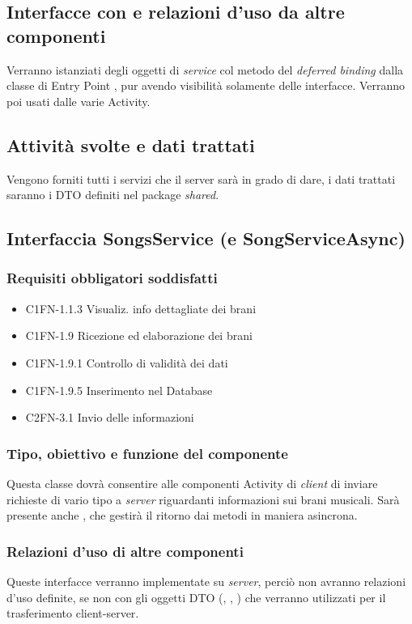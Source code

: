 \subsection*{Interfacce con e relazioni d'uso da altre componenti}
Verranno istanziati degli oggetti di \emph{service} col metodo del
\emph{deferred binding} dalla classe di Entry Point , pur avendo
visibilit\`a solamente delle interfacce. Verranno poi usati dalle varie Activity.

\subsection*{Attivit\`a svolte e dati trattati}
Vengono forniti tutti i servizi che il server sar\`a in grado di dare, i dati
trattati saranno i DTO definiti nel package \emph{shared}.

\subsection{Interfaccia SongsService (e SongServiceAsync)}
\subsubsection*{Requisiti obbligatori soddisfatti}
\begin{itemize}
	\item C1FN-1.1.3 Visualiz. info dettagliate dei brani
	\item C1FN-1.9 Ricezione ed elaborazione dei brani
	\item C1FN-1.9.1 Controllo di validit\`a dei dati
	\item C1FN-1.9.5 Inserimento nel Database
	\item C2FN-3.1 Invio delle informazioni
\end{itemize}
\subsubsection*{Tipo, obiettivo e funzione del componente}
Questa classe dovr\`a consentire alle componenti Activity di \emph{client} di
inviare richieste di vario tipo a \emph{server} riguardanti informazioni sui
brani musicali. Sar\`a presente anche , che gestir\`a il ritorno
dai metodi in maniera asincrona.

\subsubsection*{Relazioni d'uso di altre componenti}
Queste interfacce verranno implementate su \emph{server}, perci\`o non
avranno relazioni d'uso definite, se non con gli oggetti DTO
(, , ) che verranno
utilizzati per il trasferimento client-server.

